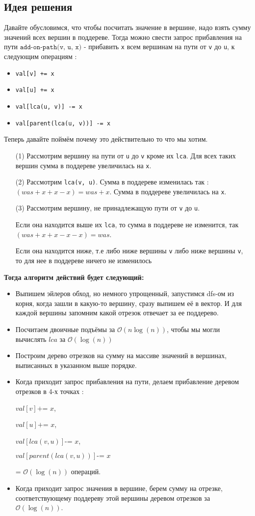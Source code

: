 \documentclass{article}
\begin{document}
\subsection*{Идея решения}
Давайте обусловимся, что чтобы посчитать значение в вершине, надо взять сумму значений всех вершин в поддереве. Тогда можно свести запрос прибавления на пути $\texttt{add-on-path(v, u, x)}$ - прибавить \texttt{x} всем вершинам на пути от \texttt{v} до \texttt{u}, к следующим операциям :
\begin{itemize}
\item \texttt{val[v] += x}
\item \texttt{val[u] += x}
\item \texttt{val[lca(u, v)] -= x}
\item \texttt{val[parent(lca(u, v))] -= x}
\end{itemize}
Теперь давайте поймём почему это действительно то что мы хотим.
\begin{itemize}
\item[(1)] Рассмотрим вершину на пути от \texttt{u} до \texttt{v} кроме их \texttt{lca}. Для всех таких вершин сумма в поддереве увеличилась на \texttt{x}.
\item[(2)] Рассмотрим \texttt{lca(v, u)}. Сумма в поддереве изменилась так : $(was + x + x - x) = was + x$. Сумма в поддереве увеличилась на \texttt{x}.
\item[(3)] Рассмотрим вершину, не принадлежащую пути от \texttt{v} до \texttt{u}. 

Если она находится выше их \texttt{lca}, то сумма в поддереве не изменится, так $(was + x + x - x - x) = was$.

Если она находится ниже, т.е либо ниже вершины \texttt{v} либо ниже  вершины \texttt{v}, то для нее в поддереве ничего не изменилось
\end{itemize}
\textbf{Тогда алгоритм действий будет следующий:} 
\begin{itemize}
\item Выпишем эйлеров обход, но немного упрощенный, запустимся dfs-ом из корня, когда зашли в какую-то вершину, сразу выпишем её в вектор. И для каждой вершины запомним какой отрезок отвечает за ее поддерево.
\item Посчитаем двоичные подъёмы за $\mathcal{O}(n\log(n))$, чтобы мы могли вычислять $lca$ за $\mathcal{O}(\log(n))$
\item Построим дерево отрезков на сумму на массиве значений в вершинах, выписанных в указанном выше порядке.
\item Когда приходит запрос прибавления на пути, делаем прибавление деревом отрезков в 4-х точках :

$val[v] \texttt{+= } x$, 

$val[u] \texttt{+= } x$, 

$val[lca(v, u)] \texttt{-= } x $, 

$val[parent(lca(v, u))] \texttt{-= } x$


= $\mathcal{O}(\log(n))$ операций.
\item Когда приходит запрос значения в вершине, берем сумму на отрезке, соответствующему поддереву этой вершины деревом отрезков за $\mathcal{O}(\log(n))$.
\end{itemize}
\end{document}
